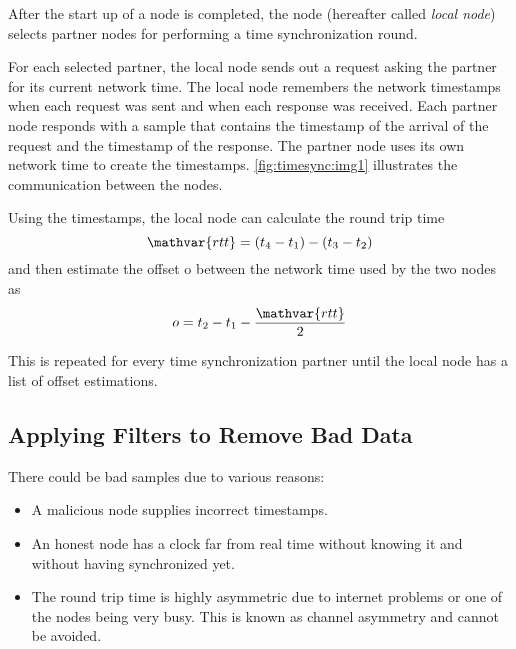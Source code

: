 After the start up of a node is completed, the node (hereafter called \emph{local node}) selects partner nodes for performing a time synchronization round.

For each selected partner, the local node sends out a request asking the partner for its current network time.
The local node remembers the network timestamps when each request was sent and when each response was received.
Each partner node responds with a sample that contains the timestamp of the arrival of the request and the timestamp of the response.
The partner node uses its own network time to create the timestamps.
\autoref{fig:timesync:img1} illustrates the communication between the nodes.

\begin{figure}
\end{figure}

Using the timestamps, the local node can calculate the round trip time
$$\mathvar{rtt} = (t_4 - t_1) - (t_3 - t_2)$$
and then estimate the offset o between the network time used by the two nodes as
$$o = t_2 - t_1 - \frac{\mathvar{rtt}}{2}$$

This is repeated for every time synchronization partner until the local node has a list of offset estimations.

\subsection{Applying Filters to Remove Bad Data}

There could be bad samples due to various reasons:
\begin{itemize}
	\item{A malicious node supplies incorrect timestamps.}
	\item{An honest node has a clock far from real time without knowing it and without having synchronized yet.}
	\item{
		The round trip time is highly asymmetric due to internet problems or one of the nodes being very busy.
		This is known as channel asymmetry and cannot be avoided.
	}
\end{itemize}

